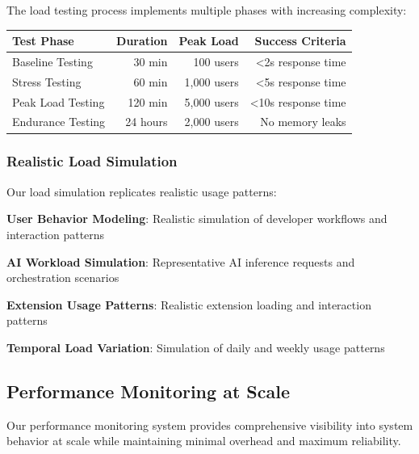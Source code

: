 The load testing process implements multiple phases with increasing complexity:

\begin{center}
\begin{tabular}{@{}lrrr@{}}
\toprule
\textbf{Test Phase} & \textbf{Duration} & \textbf{Peak Load} & \textbf{Success Criteria} \\
\midrule
Baseline Testing & 30 min & 100 users & <2s response time \\
Stress Testing & 60 min & 1,000 users & <5s response time \\
Peak Load Testing & 120 min & 5,000 users & <10s response time \\
Endurance Testing & 24 hours & 2,000 users & No memory leaks \\
\bottomrule
\end{tabular}
\end{center}

\subsubsection*{Realistic Load Simulation}

Our load simulation replicates realistic usage patterns:

\begin{compactlist}
    \item \textbf{User Behavior Modeling}: Realistic simulation of developer workflows and interaction patterns
    \item \textbf{AI Workload Simulation}: Representative AI inference requests and orchestration scenarios
    \item \textbf{Extension Usage Patterns}: Realistic extension loading and interaction patterns
    \item \textbf{Temporal Load Variation}: Simulation of daily and weekly usage patterns
\end{compactlist}

\subsection*{Performance Monitoring at Scale}

Our performance monitoring system provides comprehensive visibility into system behavior at scale while maintaining minimal overhead and maximum reliability.

